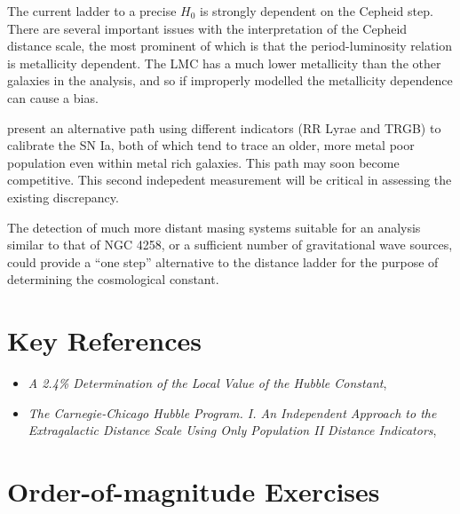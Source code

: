 The current ladder to a precise $H_0$ is strongly dependent on the
Cepheid step. There are several important issues with the
interpretation of the Cepheid distance scale, the most prominent of
which is that the period-luminosity relation is metallicity
dependent. The LMC has a much lower metallicity than the other
galaxies in the analysis, and so if improperly modelled the
metallicity dependence can cause a bias.

\citet{beaton16a} present an alternative path using different
indicators (RR Lyrae and TRGB) to calibrate the SN Ia, both of which
tend to trace an older, more metal poor population even within metal
rich galaxies. This path may soon become competitive. This second
indepedent measurement will be critical in assessing the existing
discrepancy.

The detection of much more distant masing systems suitable for an
analysis similar to that of NGC 4258, or a sufficient number of
gravitational wave sources, could provide a ``one step'' alternative
to the distance ladder for the purpose of determining the cosmological
constant.

\section{Key References}

\begin{itemize}
  \item
    {\it A 2.4\% Determination of the Local Value of the Hubble
    Constant}, \citet{riess16a}
  \item
    {\it The Carnegie-Chicago Hubble Program. I. An Independent
    Approach to the Extragalactic Distance Scale Using Only Population
    II Distance Indicators}, \citet{beaton16a} 
\end{itemize}

\section{Order-of-magnitude Exercises}

